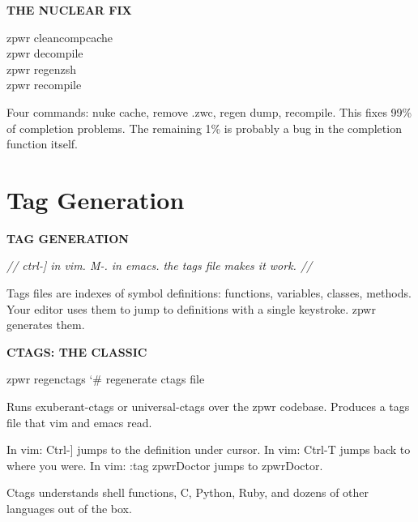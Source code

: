 \documentclass[11pt,a4paper,twoside]{book}
\begin{document}
\vspace{12pt}
{\bfseries\color{neonyellow} THE NUCLEAR FIX}\vspace{4pt}

\begin{codebox}
\color{neongreen}zpwr cleancompcache\\
\color{neongreen}zpwr decompile\\
\color{neongreen}zpwr regenzsh\\
\color{neongreen}zpwr recompile\\
\end{codebox}

Four commands: nuke cache, remove .zwc, regen dump, recompile. This fixes 99\% of completion problems. The remaining 1\% is probably a bug in the completion function itself.


\vspace{16pt}

\section{Tag Generation}


\vspace{10pt}
{\large\bfseries\color{neoncyan} TAG GENERATION}\vspace{6pt}

{\small\itshape\color{dimtext} // ctrl-] in vim. M-. in emacs. the tags file makes it work. //}

Tags files are indexes of symbol definitions: functions, variables, classes, methods. Your editor uses them to jump to definitions with a single keystroke. zpwr generates them.


\vspace{12pt}
{\bfseries\color{neonyellow} CTAGS: THE CLASSIC}\vspace{4pt}

\begin{codebox}
\color{neongreen}zpwr regenctags                     {\char`\#} regenerate ctags file\\
\end{codebox}

Runs exuberant-ctags or universal-ctags over the zpwr codebase. Produces a tags file that vim and emacs read.

In vim: Ctrl-] jumps to the definition under cursor. In vim: Ctrl-T jumps back to where you were. In vim: :tag zpwrDoctor jumps to zpwrDoctor.

Ctags understands shell functions, C, Python, Ruby, and dozens of other languages out of the box.
\end{document}
